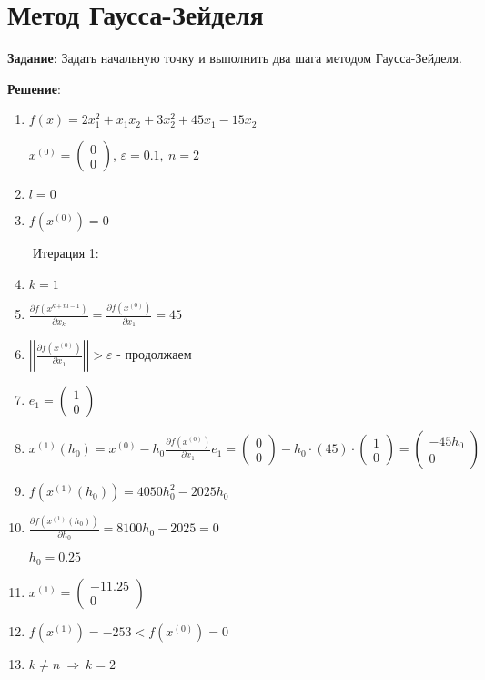 \documentclass{article}
\begin{document}
\pagebreak

\section{Метод Гаусса-Зейделя}

\textbf{Задание}: Задать начальную точку и выполнить два шага методом Гаусса-Зейделя.

\textbf{Решение}:

\begin{enumerate}
    \item
        $f(x) = 2x_1^2 + x_1x_2 + 3x_2^2 + 45x_1 - 15x_2$
        
        $x^{(0)} = \begin{pmatrix} 0 \\ 0 \end{pmatrix}$, 
        $\varepsilon = 0.1, \ n = 2$
        
    \item $l = 0$
    \item $f(x^{(0)}) = 0$
\end{enumerate}

\ \ \ \ Итерация 1:

\begin{enumerate}
    \setcounter{enumi}{3}
    \item $k = 1$
    \item $\frac{\partial f(x^{k+nl-1})}{\partial x_k} = \frac{\partial f(x^{(0)})}{\partial x_1} = 45$
    \item $\left|\left|\frac{\partial f(x^{(0)})}{\partial x_1}\right|\right| > \varepsilon$ - продолжаем
    \item $e_{1} = \begin{pmatrix} 1 \\ 0 \end{pmatrix}$
    \item $x^{(1)}(h_0) = x^{(0)} - h_0 \frac{\partial f(x^{(0)})}{\partial x_1} e_1 = 
        \begin{pmatrix} 0 \\ 0 \end{pmatrix} - h_0 \cdot (45) \cdot \begin{pmatrix} 1 \\ 0 \end{pmatrix} = 
        \begin{pmatrix} -45h_0 \\ 0 \end{pmatrix}$
        
    \item $f(x^{(1)}(h_0)) = 4050h_0^2 - 2025h_0$
    \item $\frac{\partial f(x^{(1)}(h_0))}{\partial h_0} = 8100h_0 - 2025 = 0$
        
        $h_0 = 0.25$
    \item $x^{(1)} = \begin{pmatrix} -11.25 \\ 0 \end{pmatrix}$
    \item $f(x^{(1)}) = -253 < f(x^{(0)}) = 0$
    \item $k \ne n \ \Rightarrow \ k = 2$
\end{enumerate}
\end{document}
